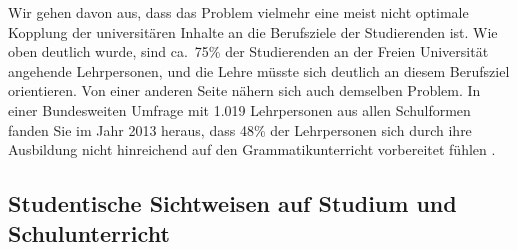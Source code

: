 Wir gehen davon aus, dass das Problem vielmehr eine meist nicht optimale Kopplung der universitären Inhalte an die Berufsziele der Studierenden ist.
Wie oben deutlich wurde, sind ca.\ 75\% der Studierenden an der Freien Universität angehende Lehrpersonen, und die Lehre müsste sich deutlich an diesem Berufsziel orientieren.
Von einer anderen Seite nähern sich auch \citet{TopalovicDuenschede2014} demselben Problem.
In einer Bundesweiten Umfrage mit 1.019 Lehrpersonen aus allen Schulformen fanden Sie im Jahr 2013 heraus, dass 48\% der Lehrpersonen sich durch ihre Ausbildung nicht hinreichend auf den Grammatikunterricht vorbereitet fühlen \citep[76--77]{TopalovicDuenschede2014}.


\subsection{Studentische Sichtweisen auf Studium und Schulunterricht}
\label{sec:studentischesichtweisenaufstudiumundschulunterricht}

\begin{figure}[htpb]
  \centering
  \caption{}
  \label{fig:studentischesichtweisenaufstudiumundschulunterricht001}
\end{figure}





